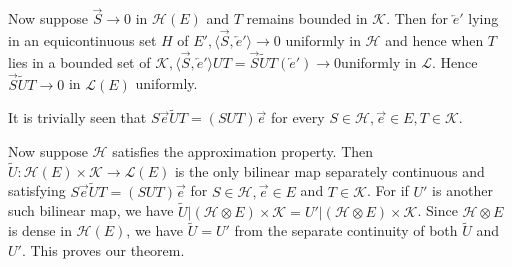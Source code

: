 Now suppose $\overrightarrow{S} \to 0$ in $\mathscr{H} (E)$ and $T$
remains bounded in $\mathscr{K}$. Then for $\overleftarrow{e}'$ lying
in an equicontinuous set $H$ of $E', \langle \overrightarrow{S},
\overleftarrow{e}' \rangle \to 0$ uniformly in $\mathscr{H}$ and hence
when $T$ lies in a bounded set of $\mathscr{K},\langle
\overrightarrow{S}, \overleftarrow{e}'\rangle UT =
\overrightarrow{S}\tilde{U} T (\overleftarrow{e}') \to
0$\pageoriginale uniformly in $\mathscr{L}$. Hence $\overrightarrow{S}
\tilde{U}T\to 0$ in $\mathscr{L}(E)$ uniformly.

It is trivially seen that $S \overrightarrow{e} \tilde{U} T = (S U T)
\overrightarrow{e}$ for every $S\in\mathscr{H}, \overrightarrow{e}\in
E, T \in \mathscr{K}$. 

Now suppose $\mathscr{H}$ satisfies the approximation property. Then
$\tilde{U} : \mathscr{H}(E)\times \mathscr{K} \to \mathscr{L} (E)$ is the
only bilinear map separately continuous and satisfying
$S\overrightarrow{e} \tilde{U} T = (S U T) \overrightarrow{e}$ for
$S\in\mathscr{H}, \overrightarrow{e} \in E$ and $T \in
\mathscr{K}$. For if $U'$ is another such bilinear map, we have
$\tilde{U} \left|(\mathscr{H}\otimes
E)\times\mathscr{K}=U'\right|(\mathscr{H}\otimes
E)\times\mathscr{K}$. Since $\mathscr{H}\otimes E$ is dense in
$\mathscr{H}(E)$, we have $\tilde{U}=U'$ from the separate continuity
of both $\tilde{U}$ and $U'$. This proves our theorem.

